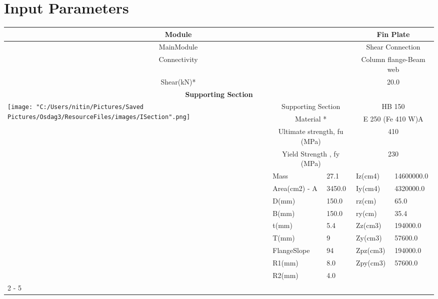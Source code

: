 \documentclass{article}%
\begin{document}
%
\normalsize%
\pagestyle{header}%
\section{Input Parameters}%
\label{sec:InputParameters}%
\renewcommand{\arraystretch}{1.2}%
\begin{longtable}{|p{5cm}|p{2cm}|p{2cm}|p{2cm}|p{5cm}|}%
\hline%
\hline%
\multicolumn{3}{|c|}{Module}&\multicolumn{2}{|c|}{Fin Plate}\\%
\hline%
\hline%
\multicolumn{3}{|c|}{MainModule}&\multicolumn{2}{|c|}{Shear Connection}\\%
\hline%
\hline%
\multicolumn{3}{|c|}{Connectivity}&\multicolumn{2}{|c|}{Column flange{-}Beam web}\\%
\hline%
\hline%
\multicolumn{3}{|c|}{Shear(kN)*}&\multicolumn{2}{|c|}{20.0}\\%
\hline%
\hline%
\multicolumn{5}{|c|}{\textbf{Supporting Section}}\\%
\hline%
\hline%
\multirow{13}{*}{\texttt{[image: "C:/Users/nitin/Pictures/Saved Pictures/Osdag3/ResourceFiles/images/ISection".png]}}&\multicolumn{2}{|c|}{Supporting Section}&\multicolumn{2}{|c|}{HB 150}\\%
\cline{2%
-%
5}%
&\multicolumn{2}{|c|}{Material *}&\multicolumn{2}{|c|}{E 250 (Fe 410 W)A}\\%
\cline{2%
-%
5}%
&\multicolumn{2}{|c|}{Ultimate strength, fu (MPa)}&\multicolumn{2}{|c|}{410}\\%
\cline{2%
-%
5}%
&\multicolumn{2}{|c|}{Yield Strength , fy (MPa)}&\multicolumn{2}{|c|}{230}\\%
\cline{2%
-%
5}%
&Mass&27.1&Iz(cm4)&14600000.0\\%
\cline{2%
-%
5}%
&Area(cm2) {-} A&3450.0&Iy(cm4)&4320000.0\\%
\cline{2%
-%
5}%
&D(mm)&150.0&rz(cm)&65.0\\%
\cline{2%
-%
5}%
&B(mm)&150.0&ry(cm)&35.4\\%
\cline{2%
-%
5}%
&t(mm)&5.4&Zz(cm3)&194000.0\\%
\cline{2%
-%
5}%
&T(mm)&9&Zy(cm3)&57600.0\\%
\cline{2%
-%
5}%
&FlangeSlope&94&Zpz(cm3)&194000.0\\%
\cline{2%
-%
5}%
&R1(mm)&8.0&Zpy(cm3)&57600.0\\%
\cline{2%
-%
5}%
&R2(mm)&4.0&&\\%
\cline{2%
-%
5}%
\hline%
\multicolumn{5}{|c|}{\textbf{Supported Section}}\\%
\hline%
\hline%

\end{longtable}
\end{document}
